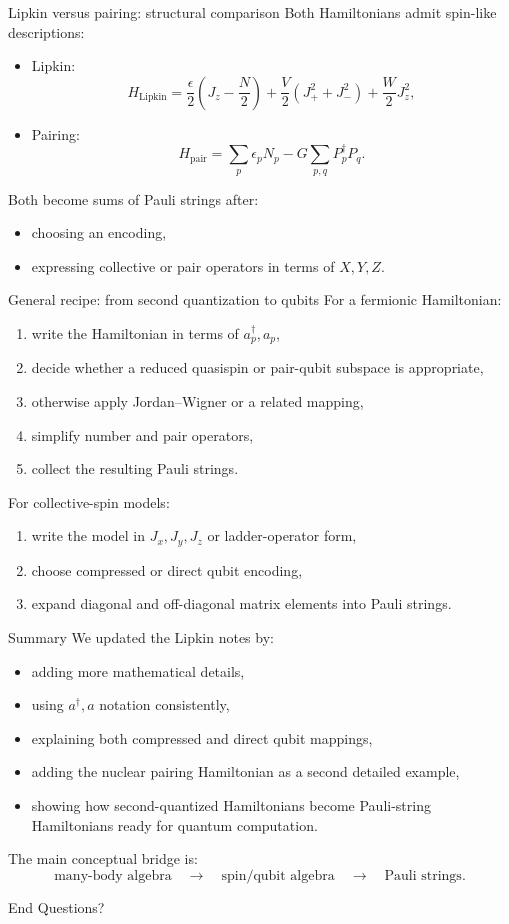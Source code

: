 \documentclass[aspectratio=169]{beamer}
\begin{document}
\begin{frame}{Lipkin versus pairing: structural comparison}
Both Hamiltonians admit spin-like descriptions:
\begin{itemize}
\item Lipkin:
\[
H_{\mathrm{Lipkin}}
=
\frac{\epsilon}{2}\left(J_z-\frac{N}{2}\right)
+\frac{V}{2}(J_+^2+J_-^2)
+\frac{W}{2}J_z^2,
\]
\item Pairing:
\[
H_{\mathrm{pair}}
=
\sum_p \epsilon_p N_p - G\sum_{p,q} P_p^\dagger P_q.
\]
\end{itemize}

Both become sums of Pauli strings after:
\begin{itemize}
\item choosing an encoding,
\item expressing collective or pair operators in terms of \(X,Y,Z\).
\end{itemize}
\end{frame}

\begin{frame}{General recipe: from second quantization to qubits}
For a fermionic Hamiltonian:
\begin{enumerate}
\item write the Hamiltonian in terms of \(a_p^\dagger,a_p\),
\item decide whether a reduced quasispin or pair-qubit subspace is appropriate,
\item otherwise apply Jordan--Wigner or a related mapping,
\item simplify number and pair operators,
\item collect the resulting Pauli strings.
\end{enumerate}

For collective-spin models:
\begin{enumerate}
\item write the model in \(J_x,J_y,J_z\) or ladder-operator form,
\item choose compressed or direct qubit encoding,
\item expand diagonal and off-diagonal matrix elements into Pauli strings.
\end{enumerate}
\end{frame}

\begin{frame}{Summary}
We updated the Lipkin notes by:
\begin{itemize}
\item adding more mathematical details,
\item using \(a^\dagger,a\) notation consistently,
\item explaining both compressed and direct qubit mappings,
\item adding the nuclear pairing Hamiltonian as a second detailed example,
\item showing how second-quantized Hamiltonians become Pauli-string Hamiltonians ready for quantum computation.
\end{itemize}

The main conceptual bridge is:
\[
\text{many-body algebra}
\quad \longrightarrow \quad
\text{spin/qubit algebra}
\quad \longrightarrow \quad
\text{Pauli strings}.
\]
\end{frame}

\begin{frame}{End}
\centering
{\Large Questions?}
\end{frame}
\end{document}
